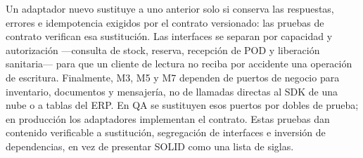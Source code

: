Un adaptador nuevo sustituye a uno anterior solo si conserva las respuestas, errores e idempotencia exigidos por el contrato versionado: las pruebas de contrato verifican esa sustitución. Las interfaces se separan por capacidad y autorización ---consulta de stock, reserva, recepción de POD y liberación sanitaria--- para que un cliente de lectura no reciba por accidente una operación de escritura. Finalmente, M3, M5 y M7 dependen de puertos de negocio para inventario, documentos y mensajería, no de llamadas directas al SDK de una nube o a tablas del ERP. En QA se sustituyen esos puertos por dobles de prueba; en producción los adaptadores implementan el contrato. Estas pruebas dan contenido verificable a sustitución, segregación de interfaces e inversión de dependencias, en vez de presentar SOLID como una lista de siglas.

